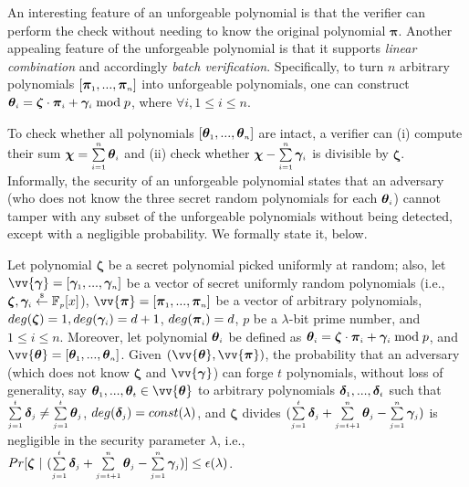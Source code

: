  An interesting feature of an unforgeable polynomial is that the verifier can perform the check without needing to know the original polynomial $\bm\pi$. Another appealing feature of the unforgeable polynomial is that it supports \emph{linear combination} and accordingly \emph{batch verification}. Specifically, to turn $n$ arbitrary polynomials $[\bm\pi_{\scriptscriptstyle 1},..., \bm\pi_{\scriptscriptstyle n}]$ into unforgeable polynomials, one can construct  $\bm\theta_{\scriptscriptstyle i}=\bm\zeta\cdot \bm\pi_{\scriptscriptstyle i}+ \bm\gamma_{\scriptscriptstyle i} \bmod p$, where $\forall i, 1\leq i\leq n$.  
 
 

 
To check whether all polynomials $[\bm\theta_{\scriptscriptstyle 1},..., \bm\theta_{\scriptscriptstyle n}]$ are intact, a verifier can (i) compute their sum $\bm \chi=\sum\limits_{\scriptscriptstyle i=1}^{\scriptscriptstyle n}\bm\theta_{\scriptscriptstyle i}$ and (ii) check whether $\bm \chi- \sum\limits_{\scriptscriptstyle i=1}^{\scriptscriptstyle n}\bm\gamma_{\scriptscriptstyle i} $ is divisible by $\bm \zeta$.  Informally, the security of an unforgeable polynomial states that an adversary (who does not know the three secret random polynomials for each $\bm\theta_{\scriptscriptstyle i}$) cannot tamper with any subset of the unforgeable polynomials without being detected, except with a negligible probability. We formally state it, below. 
 
 
\vspace{-1mm}
\begin{theorem}\label{Unforgeable-Polynomials-Linear-Combination}
%
 Let polynomial $\bm\zeta$ be a secret polynomial picked uniformly at random; also, let   $\vv{\bm\gamma}=[\bm\gamma_{\st 1},..., \bm\gamma_{\st n}]$ be a vector of secret uniformly random polynomials (i.e., ${\bm\zeta}, \bm\gamma_{\scriptscriptstyle i} \stackrel{\scriptscriptstyle\$}\leftarrow \mathbb F_{\scriptscriptstyle p}[x]$),  $\vv{\bm\pi}=[\bm\pi_{\st 1},..., \bm\pi_{\st n}]$ be a vector of arbitrary polynomials,   $deg(\bm\zeta)= 1,  deg(\bm\gamma_{\scriptscriptstyle i})= d+1$,  $deg(\bm\pi_{\scriptscriptstyle i})=d$,  $p$ be a $\lambda$-bit prime number, and $1\leq i \leq n$. Moreover, let polynomial $\bm\theta_{\scriptscriptstyle i}$ be defined as  $\bm\theta_{\scriptscriptstyle i}=\bm\zeta\cdot  \bm\pi_{\scriptscriptstyle i}+ \bm\gamma_{\scriptscriptstyle i} \bmod p$, and $\vv{\bm\theta} = [\bm\theta_{\st 1},..., \bm\theta_{\st n}]$.  Given $(\vv{\bm\theta}, \vv{\bm\pi})$, the probability that an adversary (which does not know $\bm\zeta$ and $\vv{\bm\gamma}$) can forge $t$ polynomials, without loss of generality, say $\bm\theta_{\st 1},..., \bm\theta_{\st t} \in \vv{\bm\theta}$ to arbitrary polynomials $\bm\delta_{\scriptscriptstyle 1},..., \bm\delta_{\scriptscriptstyle t}$ such that   $\sum\limits_{\scriptscriptstyle j=1}^{\scriptscriptstyle t}\bm\delta_{\scriptscriptstyle j}\neq \sum\limits_{\scriptscriptstyle j=1}^{\scriptscriptstyle t}\bm\theta_{\scriptscriptstyle j}$, $deg(\bm\delta_{\scriptscriptstyle j})= const(\lambda)$, and $\bm\zeta$ divides $(\sum\limits_{\scriptscriptstyle j=1}^{\scriptscriptstyle t}\bm\delta_{\scriptscriptstyle j} + \sum\limits_{\scriptscriptstyle j=t+1}^{\scriptscriptstyle n}\bm\theta_{\scriptscriptstyle j} - \sum\limits_{\scriptscriptstyle j=1}^{\scriptscriptstyle n}\bm\gamma_{\scriptscriptstyle j} )$ is negligible in the security parameter $\lambda$, i.e.,  
%
$Pr[ \bm\zeta \ | \ (\sum\limits_{\scriptscriptstyle j=1}^{\scriptscriptstyle t}\bm\delta_{\scriptscriptstyle j} + \sum\limits_{\scriptscriptstyle j=t+1}^{\scriptscriptstyle n}\bm\theta_{\scriptscriptstyle j} - \sum\limits_{\scriptscriptstyle j=1}^{\scriptscriptstyle n}\bm\gamma_{\scriptscriptstyle j} ) ]\leq \epsilon(\lambda)$. 

\end{theorem}



